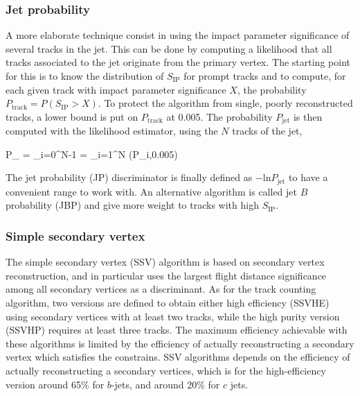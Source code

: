 
        \subsubsection{Jet probability}

    A more elaborate technique consist in using the impact parameter significance of
    several tracks in the jet. This can be done by computing a likelihood that all tracks
    associated to the jet originate from the primary vertex. The starting point for this
    is to know the distribution of $S_\text{IP}$ for prompt tracks and to compute, for
    each given track with impact parameter significance $X$, the probability $P_\text{track} =
    P(S_\text{IP} > X)$. To protect the algorithm from single, poorly reconstructed tracks,
    a lower bound is put on $P_\text{track}$ at 0.005. The probability $P_\text{jet}$ is
    then computed with the likelihood estimator, using the $N$ tracks of the jet,

    {
        P_ = \Pi \cdot \sum_{i=0}^{N-1}   \Pi = \prod_{i=1}^{N} (P_{i},0.005)
    }

    The jet probability (JP) discriminator is finally defined as $- \text{ln} P_\text{jet}$
    to have a convenient range to work with. An alternative algorithm is called jet $B$
    probability (JBP) and give more weight to tracks with high $S_\text{IP}$.


        \subsubsection{Simple secondary vertex}

    The simple secondary vertex (SSV) algorithm is based on secondary vertex reconstruction,
    and in particular uses the largest flight distance significance among all secondary
    vertices as a discriminant. As for the track counting algorithm, two versions are defined
    to obtain either high efficiency (SSVHE) using secondary vertices with at least two
    tracks, while the high purity version (SSVHP) requires at least three tracks. The
    maximum efficiency achievable with these algorithms is limited by the efficiency of
    actually reconstructing a secondary vertex which satisfies the constrains. SSV algorithms
    depends on the efficiency of actually reconstructing a secondary vertices, which is for
    the high-efficiency version around 65\% for $b$-jets, and around 20\% for $c$ jets.

